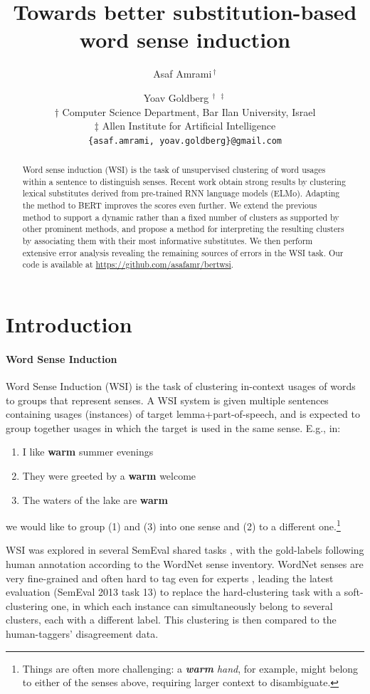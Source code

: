 \documentclass[11pt,a4paper]{article}
\title{Towards better substitution-based word sense induction}
\author{Asaf Amrami$^{~\dagger}$ \and Yoav Goldberg$^{~\dagger~\ddagger}$ \\[0.5em]
  $\dagger$ Computer Science Department, Bar Ilan University, Israel \\
  $\ddagger$ Allen Institute for Artificial Intelligence \\[0.5em]
  {\tt \{asaf.amrami, yoav.goldberg\}@gmail.com}
  }
\date{}
\begin{document}
\maketitle
\begin{abstract}
 Word sense induction (WSI) is the task of unsupervised clustering of word usages within a sentence to distinguish senses. Recent work obtain strong results by clustering lexical substitutes derived from pre-trained RNN language models (ELMo). Adapting the method to BERT improves the scores even further. We extend the previous method to support a dynamic rather than a fixed number of clusters as supported by other prominent methods, and propose a method for interpreting the resulting clusters by associating them with their most informative substitutes. We then perform extensive error analysis revealing the remaining sources of errors in the WSI task.
 Our code is available at \url{https://github.com/asafamr/bertwsi}.
\end{abstract}

\section{Introduction}

\paragraph{Word Sense Induction }

Word Sense Induction (WSI) is the task of clustering in-context usages of
words to groups that represent senses.
A WSI system is given multiple sentences containing usages (instances) of
target lemma+part-of-speech, and is expected to group together usages in which
the target is used in the same sense. E.g., in:

\begin{enumerate}[itemsep=-2mm]
\item I like \textbf{warm} summer evenings
\item They were greeted by a \textbf{warm} welcome
\item The waters of the lake are \textbf{warm}
\end{enumerate}
we would like to group (1) and (3) into one sense and (2) to a different
one.\footnote{Things are often more challenging: a \textit{\textbf{warm} hand},
for example, might belong to either of the senses above, requiring larger
context to disambiguate.}

WSI was explored in several SemEval shared tasks
\cite{semeval2007wsi,semeval2010wsi,semeval2013wsi}, with the gold-labels
following human annotation according to the WordNet \cite{wordnet} sense inventory.
WordNet senses are very fine-grained and often hard to tag even for experts \citep{snyder2004english}, leading the latest evaluation (SemEval 2013 task 13) to replace
the hard-clustering task with a soft-clustering one, in which each instance can simultaneously belong to several clusters, each with a different label. This clustering is then compared to
the human-taggers' disagreement data.
\end{document}
